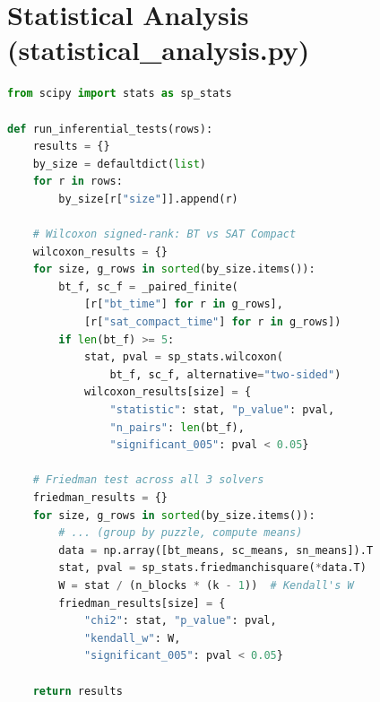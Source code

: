 \documentclass[12pt]{article}
\begin{document}
\section{Statistical Analysis (statistical\_analysis.py)}
\label{app:stats}
\begin{lstlisting}[language=Python, caption={Inferential tests (excerpt)}]
from scipy import stats as sp_stats

def run_inferential_tests(rows):
    results = {}
    by_size = defaultdict(list)
    for r in rows:
        by_size[r["size"]].append(r)

    # Wilcoxon signed-rank: BT vs SAT Compact
    wilcoxon_results = {}
    for size, g_rows in sorted(by_size.items()):
        bt_f, sc_f = _paired_finite(
            [r["bt_time"] for r in g_rows],
            [r["sat_compact_time"] for r in g_rows])
        if len(bt_f) >= 5:
            stat, pval = sp_stats.wilcoxon(
                bt_f, sc_f, alternative="two-sided")
            wilcoxon_results[size] = {
                "statistic": stat, "p_value": pval,
                "n_pairs": len(bt_f),
                "significant_005": pval < 0.05}

    # Friedman test across all 3 solvers
    friedman_results = {}
    for size, g_rows in sorted(by_size.items()):
        # ... (group by puzzle, compute means)
        data = np.array([bt_means, sc_means, sn_means]).T
        stat, pval = sp_stats.friedmanchisquare(*data.T)
        W = stat / (n_blocks * (k - 1))  # Kendall's W
        friedman_results[size] = {
            "chi2": stat, "p_value": pval,
            "kendall_w": W,
            "significant_005": pval < 0.05}

    return results
\end{lstlisting}


\clearpage
\thispagestyle{plain}  


\end{document}
